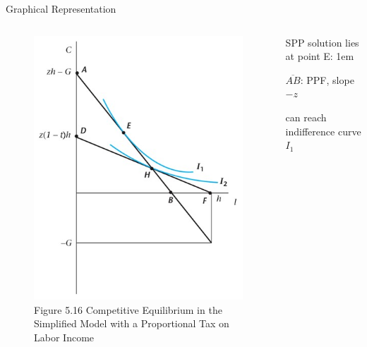 \documentclass[11pt,aspectratio=43]{beamer}
\let\olditemize=\itemize
\let\endolditemize=\enditemize
\renewenvironment{itemize}{\olditemize \itemsep1em}{\endolditemize}
\theoremstyle{definition}
\begin{document}
\begin{frame}{Graphical Representation}
\label{slide:Graphical_Representation}
    \begin{columns}
        \begin{column}{0.5\textwidth}
            \begin{figure}
                \caption{\scriptsize Figure 5.16  Competitive Equilibrium in the Simplified Model with a Proportional Tax on Labor Income}
                \includegraphics[width=\textwidth]{./figures/Figure_5_16.jpg}
            \end{figure}
        \end{column}
        \begin{column}{0.5\textwidth}
            SPP solution lies at point E:
            \begin{itemize}
                \item $\overline{AB}$: PPF, slope  $ -z $
                \item can reach indifference curve $ I_{1} $
            \end{itemize}

\end{column}
\end{columns}
\end{frame}
\end{document}
